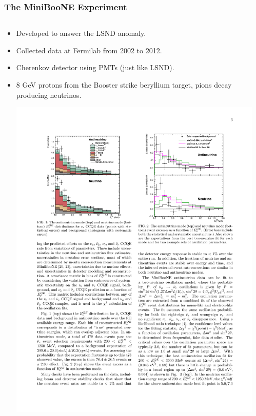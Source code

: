 \documentclass[mathserif,18pt,xcolor=table]{beamer}
\begin{document}
\begin{frame}
  \frametitle{The MiniBooNE Experiment}
  \scriptsize{
    \begin{columns}
      \begin{column}{.5\linewidth}      
        \begin{itemize}
        \item Developed to answer the LSND anomaly.
        \item Collected data at Fermilab from 2002 to 2012.
        \item Cherenkov detector using PMTs (just like LSND).
        \item 8 GeV protons from the Booster strike beryllium target, pions decay producing neutrinos.
          \begin{center}
            \includegraphics[width=.9\linewidth]{../figures/miniboone_excess.pdf}
          \end{center}
        \end{itemize}
      \end{column}
      \begin{column}{.5\linewidth}
        \begin{itemize}

\end{itemize}
\end{column}
\end{columns}}
\end{frame}
\end{document}

